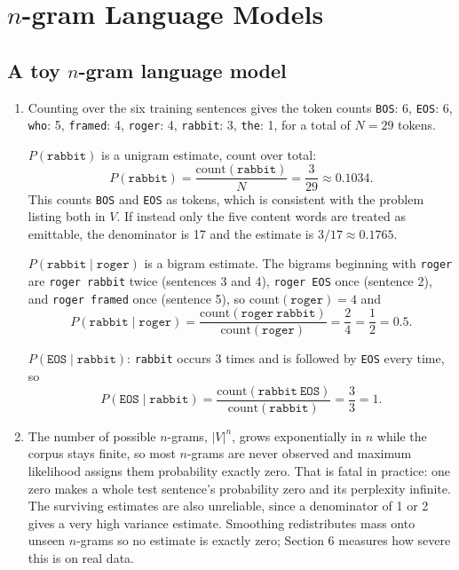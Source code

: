 \documentclass[11pt]{article}
\begin{document}
\section{$n$-gram Language Models}

\subsection{A toy $n$-gram language model}

\begin{enumerate}
  \item Counting over the six training sentences gives the token counts
        \texttt{BOS}: 6, \texttt{EOS}: 6, \texttt{who}: 5, \texttt{framed}: 4, \texttt{roger}: 4,
        \texttt{rabbit}: 3, \texttt{the}: 1, for a total of $N = 29$ tokens.

        $P(\texttt{rabbit})$ is a unigram estimate, count over total:
        \[
          P(\texttt{rabbit}) = \frac{\text{count}(\texttt{rabbit})}{N} = \frac{3}{29} \approx 0.1034 .
        \]
        This counts \texttt{BOS} and \texttt{EOS} as tokens, which is consistent with the problem listing
        both in $V$. If instead only the five content words are treated as emittable, the denominator is 17
        and the estimate is $3/17 \approx 0.1765$.

        $P(\texttt{rabbit}\mid\texttt{roger})$ is a bigram estimate. The bigrams beginning with
        \texttt{roger} are \texttt{roger rabbit} twice (sentences 3 and 4), \texttt{roger EOS} once
        (sentence 2), and \texttt{roger framed} once (sentence 5), so
        $\text{count}(\texttt{roger}) = 4$ and
        \[
          P(\texttt{rabbit}\mid\texttt{roger})
          = \frac{\text{count}(\texttt{roger}\ \texttt{rabbit})}{\text{count}(\texttt{roger})}
          = \frac{2}{4} = \frac{1}{2} = 0.5 .
        \]

        $P(\texttt{EOS}\mid\texttt{rabbit})$: \texttt{rabbit} occurs 3 times and is followed by
        \texttt{EOS} every time, so
        \[
          P(\texttt{EOS}\mid\texttt{rabbit})
          = \frac{\text{count}(\texttt{rabbit}\ \texttt{EOS})}{\text{count}(\texttt{rabbit})}
          = \frac{3}{3} = 1 .
        \]


  \item The number of possible $n$-grams, $|V|^n$, grows exponentially in $n$ while the corpus stays
        finite, so most $n$-grams are never observed and maximum likelihood assigns them probability
        exactly zero. That is fatal in practice: one zero makes a whole test sentence's probability zero
        and its perplexity infinite. The surviving estimates are also unreliable, since a denominator of 1
        or 2 gives a very high variance estimate. Smoothing redistributes mass onto unseen $n$-grams so no
        estimate is exactly zero; Section 6 measures how severe this is on real data.
\end{enumerate}
\end{document}
